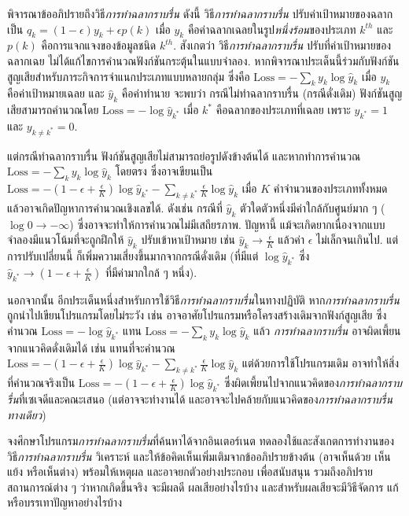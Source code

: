 \begin{Exercise}
\label{ex: label smoothing}

พิจารณาข้ออภิปรายถึงวิธี\textit{การทำฉลากราบรื่น} ดังนี้
วิธี\textit{การทำฉลากราบรื่น}\cite{SzegedyEtAl2016}
ปรับค่าเป้าหมายของฉลากเป็น
$q_k = (1 - \epsilon) y_k + \epsilon p(k)$
เมื่อ $y_k$ คือค่าฉลากเฉลยในรูป\textit{หนึ่งร้อน}ของประเภท $k^{th}$  
และ $p(k)$ คือการแจกแจงของข้อมูลชนิด $k^{th}$. 
สังเกตว่า วิธี\textit{การทำฉลากราบรื่น}
ปรับที่ค่าเป้าหมายของฉลากเฉย ไม่ได้แก้ไขการคำนวณฟังก์ชันกระตุ้นในแบบจำลอง.
หากพิจารณาประเด็นนี้ร่วมกับฟังก์ชันสูญเสียสำหรับภาระกิจการจำแนกประเภทแบบหลายกลุ่ม
ซึ่งคือ $\mathrm{Loss} = - \sum_k y_k \log \hat{y}_k$ เมื่อ $y_k$ คือค่าเป้าหมายเฉลย และ $\hat{y}_k$ คือค่าทำนาย
จะพบว่า 
กรณีไม่ทำฉลากราบรื่น (กรณีดั่งเดิม) ฟังก์ชันสูญเสียสามารถคำนวณโดย
$\mathrm{Loss} = -\log \hat{y}_{k^\ast}$ เมื่อ $k^\ast$ คือฉลากของประเภทที่เฉลย
เพราะ $y_{k^\ast} = 1$ และ $y_{k \neq k^\ast} = 0$.

แต่กรณีทำฉลากราบรื่น ฟังก์ชันสูญเสียไม่สามารถย่อรูปดังข้างต้นได้
และหากทำการคำนวณ
$\mathrm{Loss} = - \sum_k y_k \log \hat{y}_k$ 
โดยตรง ซึ่งอาจเขียนเป็น 
$\mathrm{Loss} = - (1 - \epsilon + \frac{\epsilon}{K}) \log \hat{y}_{k^\ast} - \sum_{k \neq {k^\ast}} \frac{\epsilon}{K} \log \hat{y}_k$
เมื่อ $K$ คำจำนวนของประเภททั้งหมด
แล้วอาจเกิดปัญหาการคำนวณเชิงเลขได้.
ดังเช่น กรณีที่ $\hat{y}_k$ ตัวใดตัวหนึ่งมีค่าใกล้กับศูนย์มาก ๆ ($\log 0 \rightarrow -\infty$) ซึ่งอาจจะทำให้การคำนวณไม่มีเสถียรภาพ.
ปัญหานี้ แม้จะเกิดยากเนื่องจากแบบจำลองมีแนวโน้มที่จะถูกฝึกให้ $\hat{y}_k$ ปรับเข้าหาเป้าหมาย เช่น $\hat{y}_k \rightarrow \frac{\epsilon}{K}$ แล้วค่า $\epsilon$ ไม่เล็กจนเกินไป.
แต่การปรับเปลี่ยนนี้ ก็เพิ่มความเสี่ยงขึ้นมากจากกรณีดั่งเดิม (ที่มีแต่ $\log \hat{y}_{k^\ast}$ ซึ่ง $\hat{y}_{k^\ast} \rightarrow (1 - \epsilon + \frac{\epsilon}{K})$ ที่มีค่ามากใกล้ ๆ หนึ่ง).

นอกจากนั้น อีกประเด็นหนึ่งสำหรับการใช้วิธี\textit{การทำฉลากราบรื่น}ในทางปฏิบัติ
หาก\textit{การทำฉลากราบรื่น}ถูกนำไปเขียนโปรแกรมโดยไม่ระวัง เช่น อาจอาศัยโปรแกรมหรือโครงสร้างเดิมจากฟังก์สูญเสีย 
ซึ่งคำนวณ $\mathrm{Loss} = -\log \hat{y}_{k^\ast}$ แทน $\mathrm{Loss} = - \sum_k y_k \log \hat{y}_k$
แล้ว
\textit{การทำฉลากราบรื่น} อาจผิดเพี้ยนจากแนวคิดดั่งเดิมได้ 
เช่น
แทนที่จะคำนวณ 
$\mathrm{Loss} = - (1 - \epsilon + \frac{\epsilon}{K}) \log \hat{y}_{k^\ast} - \sum_{k \neq {k^\ast}} \frac{\epsilon}{K} \log \hat{y}_k$ 
แต่ด้วยการใช้โปรแกรมเดิม อาจทำให้สิ่งที่คำนวณจริงเป็น
$\mathrm{Loss} = -(1 - \epsilon + \frac{\epsilon}{K}) \log \hat{y}_{k^\ast}$
ซึ่งผิดเพี้ยนไปจากแนวคิดของ\textit{การทำฉลากราบรื่น}ที่เซเจดีและคณะ\cite{SzegedyEtAl2016}เสนอ
(แต่อาจจะทำงานได้ และอาจจะไปคล้ายกับแนวคิดของ\textit{การทำฉลากราบรื่นทางเดียว})


จงศึกษาโปรแกรม\textit{การทำฉลากราบรื่น}ที่ค้นหาได้จากอินเตอร์เนต ทดลองใช้และสังเกตการทำงานของวิธี\textit{การทำฉลากราบรื่น}
วิเคราะห์ และให้ข้อคิดเห็นเพิ่มเติมจากข้ออภิปรายข้างต้น (อาจเห็นด้วย เห็นแย้ง หรือเห็นต่าง) พร้อมให้เหตุผล และอาจยกตัวอย่างประกอบ เพื่อสนับสนุน
รวมถึงอภิปรายสถานการณ์ต่าง ๆ ว่าหากเกิดขึ้นจริง จะมีผลดี ผลเสียอย่างไรบ้าง และสำหรับผลเสียจะมีวิธีจัดการ แก้หรือบรรเทาปัญหาอย่างไรบ้าง

\end{Exercise}

